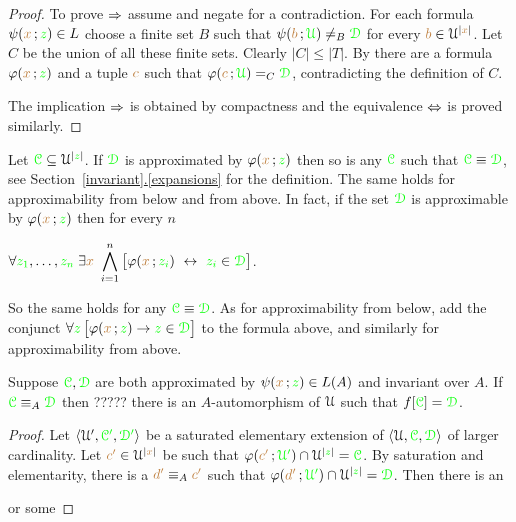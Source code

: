 \documentclass[creche.tex]{subfiles}
\begin{document}
\begin{proof}
To prove $\Rightarrow$ assume  and negate  for a contradiction. For each formula $\psi({\color{brown} x}\,;{\color{green} z})\in L$ choose a finite set $B$ such that $\psi({\color{brown} b}\,;{\color{green}\EuScript U})\neq_B{\color{green}\EuScript D}$ for every ${\color{brown} b}\in\EuScript U^{|{\color{brown} x}|}$. Let $C$ be the union of all these finite sets. Clearly $|C|\le|T|$. By  there are a formula $\varphi({\color{brown} x}\,;{\color{green} z})$ and a tuple ${\color{brown} c}$ such that $\varphi({\color{brown} c}\,;{\color{green}\EuScript U})=_C{\color{green}\EuScript D}$, contradicting the definition of $C$.

The implication $\Rightarrow$ is obtained by compactness and the equivalence $\Leftrightarrow$ is proved similarly. 
\end{proof}



\begin{remark}\label{prop_approx_el_eq}
Let ${\color{green}\EuScript C}\subseteq\EuScript U^{|{\color{green} z}|}$. If ${\color{green}\EuScript D}$ is approximated by $\varphi({\color{brown} x}\,;{\color{green} z})$ then so is any ${\color{green}\EuScript C}$ such that ${\color{green}\EuScript C}\equiv{\color{green}\EuScript D}$, see Section~\hyperref[expansions]{\ref{invariant}.\ref{expansions}} for the definition. The same holds for approximability from below and from above. In fact, if the set ${\color{green}\EuScript D}$ is approximable by $\varphi({\color{brown} x}\,;{\color{green} z})$ then for every $n$

\hfil$\displaystyle\A {\gr z_1},\dots,{\gr z_n}\;\E {\mr x}\ \bigwedge^n_{i=1}\big[\phi({\mr x}\,;{\gr z_i})\ \iff\ {\gr z_i}\in{\gr \D}\big]$. 

So the same holds for any ${\color{green}\EuScript C}\equiv{\color{green}\EuScript D}$. As for approximability from below, add the conjunct $\forall {\color{green}z}\,\big[\varphi({\color{brown} x}\,;{\color{green} z})\rightarrow {\color{green}z}\in{\color{green}\EuScript D}\big]$ to the formula above, and similarly for approximability from above.\QED
\end{remark}


\begin{proposition}
Suppose ${\color{green}\EuScript C},{\color{green}\EuScript D}$ are both approximated by  $\psi({\color{brown} x}\,;{\color{green} z})\in L(A)$ and invariant over $A$.  If ${\color{green}\EuScript C}\equiv_A{\color{green}\EuScript D}$ then ?????  there is an $A$-automorphism of $\EuScript U$ such that $f[{\color{green}\EuScript C}]={\color{green}\EuScript D}$. 
\end{proposition}

\begin{proof}
\def\grsC{{\gr\C'}}
\def\grsD{{\gr\D'}}
Let $\<\U',\grsC,\grsD\>$ be a saturated elementary extension of $\langle\EuScript U,{\color{green}\EuScript C},{\color{green}\EuScript D}\rangle$ of larger cardinality. Let ${\color{brown} c'}\in\EuScript U^{|{\color{brown} x}|}$ be such that $\varphi({\color{brown} c'}\,;{\color{green}\EuScript U'})\cap\EuScript U^{|{\color{green} z}|}={\color{green}\EuScript C}$. By saturation and elementarity, there is a ${\color{brown} d'}\equiv_A{\color{brown} c'}$ such that $\varphi({\color{brown} d'}\,;{\color{green}\EuScript U'})\cap\EuScript U^{|{\color{green} z}|}={\color{green}\EuScript D}$. Then there is an 

or some 
\end{proof}
\end{document}
